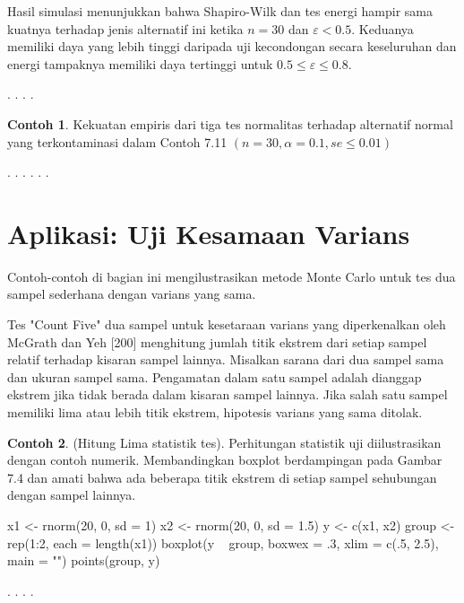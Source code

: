 \documentclass[a4paper,12pt]{article}
\theoremstyle{definition}
\newtheorem{example}{Contoh}[section]
\begin{document}
Hasil simulasi menunjukkan bahwa Shapiro-Wilk dan tes energi hampir sama kuatnya terhadap jenis alternatif ini ketika $n=30$ dan $\varepsilon<0.5$.  Keduanya memiliki daya yang lebih tinggi daripada uji kecondongan secara keseluruhan dan energi tampaknya memiliki daya tertinggi untuk $0.5 \leq \varepsilon \leq 0.8 $.

.
.
.
.

\begin{example}
    Kekuatan empiris dari tiga tes normalitas terhadap alternatif normal yang terkontaminasi dalam Contoh 7.11 $(n=30, \alpha =0.1, se\leq 0.01)$
\end{example}

.
.
.
.
.
.


\section{Aplikasi: Uji Kesamaan Varians}
Contoh-contoh di bagian ini mengilustrasikan metode Monte Carlo untuk tes dua sampel sederhana dengan varians yang sama.

Tes "Count Five" dua sampel untuk kesetaraan varians yang diperkenalkan oleh McGrath dan Yeh [200] menghitung jumlah titik ekstrem dari setiap sampel relatif terhadap kisaran sampel lainnya. Misalkan sarana dari dua sampel
sama dan ukuran sampel sama. Pengamatan dalam satu sampel adalah dianggap ekstrem jika tidak berada dalam kisaran sampel lainnya. Jika salah satu sampel memiliki lima atau lebih titik ekstrem, hipotesis varians yang sama ditolak.
\begin{example}
    (Hitung Lima statistik tes). Perhitungan statistik uji diilustrasikan dengan contoh numerik. Membandingkan boxplot berdampingan pada Gambar 7.4 dan amati bahwa ada beberapa titik ekstrem di setiap sampel sehubungan dengan sampel lainnya.
\end{example}
\begin{spverbatim}
    x1 <- rnorm(20, 0, sd = 1)
    x2 <- rnorm(20, 0, sd = 1.5)
    y <- c(x1, x2)
    group <- rep(1:2, each = length(x1))
    boxplot(y ~ group, boxwex = .3, xlim = c(.5, 2.5), main = "")
    points(group, y)
\end{spverbatim}

.
.
.
.
\end{document}
